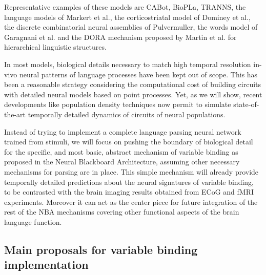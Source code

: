 \documentclass[10pt]{article}
\begin{document}
Representative examples of these models are CABot\cite{Huyck_2009}, BioPLa\cite{rosa2004thematic}, TRANNS\cite{bocancia2014psycholinguistically}, the language models of Markert et al.\cite{Markert_2007}, the corticostriatal model of Dominey et al.\cite{Dominey_2009}, the discrete combinatorial neural assemblies of Pulvermuller\cite{Pulverm_ller_2009, Pulverm_ller_2010}, the words model of Garagnani et al.\cite{Garagnani_2017} and the DORA mechanism proposed by Martin et al. for hierarchical linguistic structures\cite{Martin_2017}.

In most models, biological details necessary to match high temporal resolution in-vivo neural patterns of language processes have been kept out of scope.
This has been a reasonable strategy considering the computational cost of building circuits with detailed neural models based on point processes.
Yet, as we will show, recent developments like population density
techniques\cite{de2013generica} now permit to simulate state-of-the-art temporally detailed dynamics of circuits of neural populations.

Instead of trying to implement a complete language parsing neural network trained from stimuli, we will focus on pushing the boundary of biological detail for the specific, and most basic, abstract mechanism of variable binding as proposed in the Neural Blackboard Architecture\cite{van_der_Velde_2006}, assuming other necessary mechanisms for parsing are in place.
This simple mechanism will already provide temporally detailed predictions about the neural signatures of variable binding, to be contrasted with the brain imaging results obtained from ECoG and fMRI experiments.
Moreover it can act as the center piece for future integration of the rest of the NBA mechanisms covering other functional aspects of the brain language function.


\subsection{Main proposals for variable binding implementation}

{\label{946708}}
\end{document}
